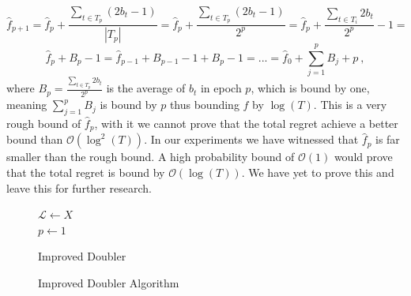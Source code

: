 \documentclass[MSc,beforeExam]{iitcsthesis}
\begin{document}
	$$\hat{f}_{p+1}=\hat{f}_{p} + 
		\frac{\sum\limits_{t\in T_p} (2b_t -1)}{|T_{p}|} = 
		\hat{f}_{p} + 
		\frac{\sum\limits_{t\in T_p} (2b_t -1)}{2^{p}} = 
		\hat{f}_{p} + 
		\frac{\sum\limits_{t\in T_i} 2b_t}{2^{p}}-1 =$$
		$$
		\hat{f}_{p} + B_p -1 =  
		\hat{f}_{p-1} +B_{p-1} -1+ B_p -1 = ... =  
		\hat{f}_{0} + \sum\limits_{j=1}^p B_{j}+p\ ,$$
	where $ B_{p} = \frac{\sum\limits_{t\in T_p} 2b_t}{2^{p}}$ is the average of $b_t$ in epoch $p$, which is bound by one, meaning 
	$\sum\limits_{j=1}^p B_{j}$ is bound by $p$ thus bounding $\hat{f}$ by $\log(T)$.
	This is a very rough bound of $\hat{f}_p$, with it we cannot prove that the total regret achieve a better bound than $\mathcal{O}(\log^2(T))$.
	In our experiments we have witnessed that $\hat{f}_p$ is far smaller than the rough bound. A high probability bound of $\mathcal{O}(1)$ would prove that the total regret is bound by $\mathcal{O}(\log(T))$.
	We have yet to prove this and leave this for further research.
	
\begin{figure}[h]
	\IncMargin{1em}
		\begin{algorithm}[H]
		\BlankLine
		$\mathcal{L} \leftarrow X$\\
		$p\leftarrow 1$\\
			\caption{Improved Doubler}
		\end{algorithm}
		\caption{Improved Doubler Algorithm}\label{algo_adv_doubler}
	\end{figure}
\newpage
\end{document}
